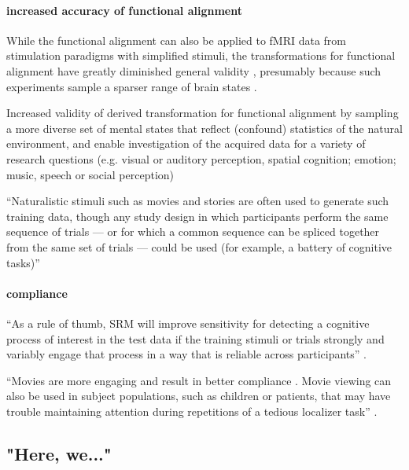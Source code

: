 
\paragraph{increased accuracy of functional alignment}
%
While the functional alignment can also be applied to fMRI data from stimulation
paradigms with simplified stimuli, the transformations for functional alignment
have greatly diminished general validity \citep{haxby2011common}, presumably
because such experiments sample a sparser range of brain states
\citep{guntupalli2016model}.

%
Increased validity of derived transformation for functional alignment by
sampling a more diverse set of mental states that reflect (confound) statistics
of the natural environment, and enable investigation of the acquired data for a
variety of research questions (e.g. visual or auditory perception, spatial
cognition; emotion; music, speech or social perception)

%
``Naturalistic stimuli such as movies and stories are often used to generate
such training data, though any study design in which participants perform the
same sequence of trials --- or for which a common sequence can be spliced
together from the same set of trials --- could be used (for example, a battery
of cognitive tasks)'' \citep{cohen2017computational}


\paragraph{compliance}
%
``As a rule of thumb, SRM will improve sensitivity for detecting a cognitive
process of interest in the test data if the training stimuli or trials strongly
and variably engage that process in a way that is reliable across participants''
\citep{cohen2017computational}.

%
``Movies are more engaging and result in better compliance
\citep{vanderwal2015inscapes}. Movie viewing can also be used in subject
populations, such as children \citep{richardson2018development} or patients,
that may have trouble maintaining attention during repetitions of a tedious
localizer task'' \citep{jiahui2020predicting}.


\subsection{"Here, we..."}


